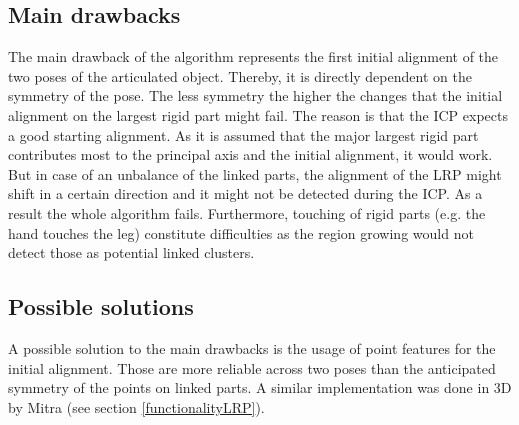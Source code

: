 \subsection{Main drawbacks}
The main drawback of the algorithm represents the first initial alignment of the two poses of the articulated object. Thereby, it is directly dependent on the symmetry of the pose. The less symmetry the higher the changes that the initial alignment on the largest rigid part might fail. The reason is that the ICP expects a good starting alignment. As it is assumed that the major largest rigid part contributes most to the principal axis and the initial alignment, it would work. But in case of an unbalance of the linked parts, the alignment of the LRP might shift in a certain direction and it might not be detected during the ICP. As a result the whole algorithm fails. Furthermore, touching of rigid parts (e.g. the hand touches the leg) constitute difficulties as the region growing would not detect those as potential linked clusters. 

\subsection{Possible solutions}

A possible solution to the main drawbacks is the usage of point features for the initial alignment. Those are more reliable across two poses than the anticipated symmetry of the points on linked parts. A similar implementation was done in 3D by Mitra \cite{Mitra07} (see section \ref{functionalityLRP}). 








